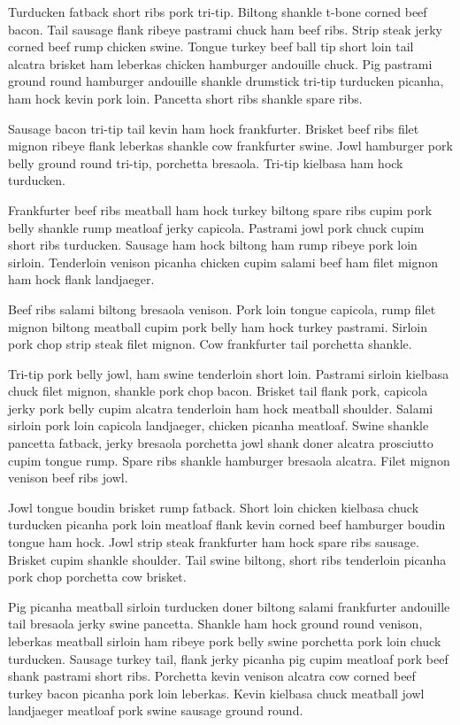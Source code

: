 Turducken fatback short ribs pork tri-tip. Biltong shankle t-bone corned beef bacon. Tail sausage flank ribeye pastrami chuck ham beef ribs. Strip steak jerky corned beef rump chicken swine. Tongue turkey beef ball tip short loin tail alcatra brisket ham leberkas chicken hamburger andouille chuck. Pig pastrami ground round hamburger andouille shankle drumstick tri-tip turducken picanha, ham hock kevin pork loin. Pancetta short ribs shankle spare ribs.

Sausage bacon tri-tip tail kevin ham hock frankfurter. Brisket beef ribs filet mignon ribeye flank leberkas shankle cow frankfurter swine. Jowl hamburger pork belly ground round tri-tip, porchetta bresaola. Tri-tip kielbasa ham hock turducken.

Frankfurter beef ribs meatball ham hock turkey biltong spare ribs cupim pork belly shankle rump meatloaf jerky capicola. Pastrami jowl pork chuck cupim short ribs turducken. Sausage ham hock biltong ham rump ribeye pork loin sirloin. Tenderloin venison picanha chicken cupim salami beef ham filet mignon ham hock flank landjaeger.

Beef ribs salami biltong bresaola venison. Pork loin tongue capicola, rump filet mignon biltong meatball cupim pork belly ham hock turkey pastrami. Sirloin pork chop strip steak filet mignon. Cow frankfurter tail porchetta shankle.

Tri-tip pork belly jowl, ham swine tenderloin short loin. Pastrami sirloin kielbasa chuck filet mignon, shankle pork chop bacon. Brisket tail flank pork, capicola jerky pork belly cupim alcatra tenderloin ham hock meatball shoulder. Salami sirloin pork loin capicola landjaeger, chicken picanha meatloaf. Swine shankle pancetta fatback, jerky bresaola porchetta jowl shank doner alcatra prosciutto cupim tongue rump. Spare ribs shankle hamburger bresaola alcatra. Filet mignon venison beef ribs jowl.

Jowl tongue boudin brisket rump fatback. Short loin chicken kielbasa chuck turducken picanha pork loin meatloaf flank kevin corned beef hamburger boudin tongue ham hock. Jowl strip steak frankfurter ham hock spare ribs sausage. Brisket cupim shankle shoulder. Tail swine biltong, short ribs tenderloin picanha pork chop porchetta cow brisket.

Pig picanha meatball sirloin turducken doner biltong salami frankfurter andouille tail bresaola jerky swine pancetta. Shankle ham hock ground round venison, leberkas meatball sirloin ham ribeye pork belly swine porchetta pork loin chuck turducken. Sausage turkey tail, flank jerky picanha pig cupim meatloaf pork beef shank pastrami short ribs. Porchetta kevin venison alcatra cow corned beef turkey bacon picanha pork loin leberkas. Kevin kielbasa chuck meatball jowl landjaeger meatloaf pork swine sausage ground round.

